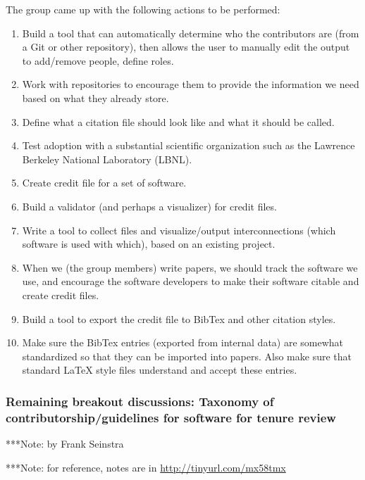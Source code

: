 \documentclass[11pt, oneside]{amsart}
\newcommand{\note}[1]{ {\textcolor{blueish}    { ***Note:      #1 }}}
\begin{document}
The group came up with the following actions to be performed:
\begin{enumerate}
\item Build a tool that can automatically determine who the contributors are
(from a Git or other repository), then allows the user to manually edit the output to
add/remove people, define roles.
\item Work with repositories to encourage them to provide the information we
need based on what they already store.
\item Define what a citation file should look like and what it should be called.
\item Test adoption with a substantial scientific organization such as the Lawrence Berkeley National Laboratory (LBNL).
\item Create credit file for a set of software.
\item Build a validator (and perhaps a visualizer) for credit files.
\item Write a tool to collect files and visualize/output interconnections (which
software is used with which), based on an existing project.
\item When we (the group members) write papers, we should track the software
we use, and encourage the software developers to make their software citable
and create credit files.
\item Build a tool to export the credit file to BibTex and other citation styles.
\item Make sure the BibTex entries (exported from internal data) are somewhat
standardized so that they can be imported into papers.  Also make sure that
standard LaTeX style files understand and accept these entries.
\end{enumerate}


\subsubsection{Remaining breakout discussions: Taxonomy of contributorship/guidelines for software for tenure review}
\note{by Frank Seinstra}

\note{for reference, notes are in \url{http://tinyurl.com/mx58tmx}}
\end{document}
